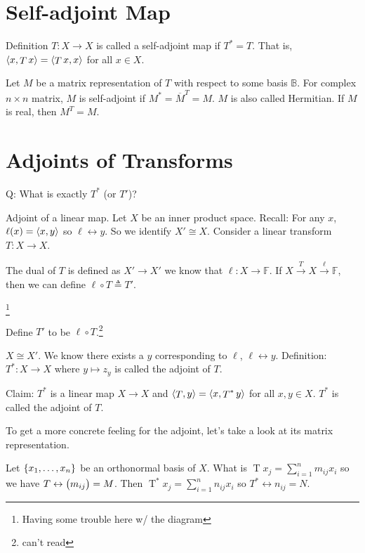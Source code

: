 \documentclass{article}
\DeclarePairedDelimiter\ip{\langle }{\rangle}
\begin{document}
\section{Self-adjoint Map}
Definition \(T: X \to X\) is called a self-adjoint map if \(T^* = T\).
That is, \(\ip{x, \mathop T x} = \ip{\mathop T x, x}\) for all \(x \in X\).

Let \(M\) be a matrix representation of \(T\) with respect to some basis \(\mathbb{B}\).
For complex \(n \times n\) matrix, \(M\) is self-adjoint if \(M^* = \overline{M}^T = M\).
\(M\) is also called Hermitian.
If \(M\) is real, then \(M^T = M\).

\section{Adjoints of Transforms}

Q: What is exactly \(T^*\) (or \(T'\))?

Adjoint of a linear map.
Let \(X\) be an inner product space.
Recall: For any \(x\), \(\ell(x) = \ip{x, y}\) so \(\ell \leftrightarrow y\).
So we identify \(X' \cong X\).
Consider a linear transform \(T: X \to X\).

The dual of \(T\) is defined as \(X' \to X'\) we know that \(\ell: X \to \mathbb{F}\).
If \(X \stackrel{T}{\to} X \stackrel{\ell}{\to} \mathbb{F}\), then we can define \(\ell \circ T \triangleq T'\).
\begin{center}
  \footnote{Having some trouble here w/ the diagram}
\end{center}

Define \(T'\) to be \(\ell \circ T\).\footnote{can't read}

\(X \cong X'\).
We know there exists a \(y\) corresponding to \(\ell\), \(\ell \leftrightarrow y\).
Definition: \(T^*: X \to X\) where \(y \mapsto z_y\) is called the adjoint of \(T\).

Claim: \(T^*\) is a linear map \(X\to X\) and \(\ip{\mathop T, y} = \ip{x, \mathop T^* y}\) for all \(x, y \in X\).
\(T^*\) is called the adjoint of \(T\).

To get a more concrete feeling for the adjoint, let's take a look at its matrix representation.

Let \(\set{x_1, \dots, x_n}\) be an orthonormal basis of \(X\).
What is \(\mathop T x_j = \sum_{i=1}^n m_{ij} x_i\) so we have \(T \leftrightarrow \del{m_{ij}} = M\).
Then \(\mathop T^* x_j = \sum_{i=1}^n n_{ij} x_i\) so \(T^* \leftrightarrow n_{ij} = N\).
\end{document}
